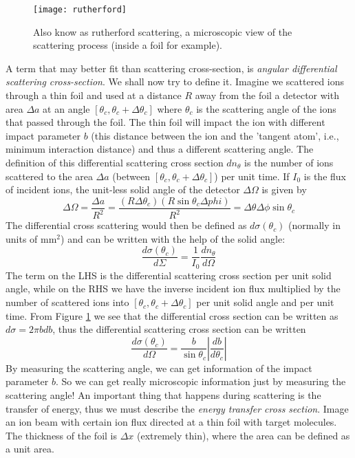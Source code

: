 \begin{figure}
	\centering
	\texttt{[image: rutherford]}
	\caption{Also know as rutherford scattering, a microscopic view of the scattering process (inside a foil for example).}
	\label{fig:rutherford}
\end{figure}
A term that may better fit than scattering cross-section, is \textit{angular differential scattering cross-section}.
We shall now try to define it.
Imagine we scattered ions through a thin foil and used at a distance $R$ away from the foil a detector with area $\Delta a$ at an angle $[\theta_c, \theta_c + \Delta \theta_c]$ where $\theta_c$ is the scattering angle of the ions that passed through the foil.
The thin foil will impact the ion with different impact parameter $b$ (this distance between the ion and the 'tangent atom', i.e., minimum interaction distance) and thus a different scattering angle.
The definition of this differential scattering cross section $dn_\theta$ is the number of ions scattered to the area $\Delta a$ (between  $[\theta_c, \theta_c + \Delta \theta_c]$) per unit time.
If $I_0$ is the flux of incident ions, the unit-less solid angle of the detector $\Delta \Omega$ is given by
$$\Delta \Omega = \frac{\Delta a}{R^2} = \frac{(R\Delta \theta_c) (R\sin\theta_c \Delta phi)}{R^2} = \Delta \theta \Delta \phi \sin\theta_c$$
The differential cross scattering would then be defined as $d\sigma (\theta_c)$ (normally in units of mm$^2$) and can be written with the help of the solid angle:
$$ \frac{d\sigma(\theta_c)}{d\Sigma} = \frac{1}{I_0} \frac{dn_\theta}{d\Omega} $$
The term on the LHS is the differential scattering cross section per unit solid angle, while on the RHS we have the inverse incident ion flux multiplied by the number of scattered ions into $[\theta_c, \theta_c + \Delta \theta_c]$ per unit solid angle and per unit time.
From Figure \ref{fig:rutherford} we see that the differential cross section can be written as $d\sigma = 2\pi b db$, thus the differential scattering cross section can be written
$$\frac{d\sigma (\theta_c)}{d\Omega} = \frac{b}{\sin\theta_c}\left|\frac{db}{d\theta_c}\right| $$
By measuring the scattering angle, we can get information of the impact parameter $b$.
So we can get really microscopic information just by measuring the scattering angle!
An important thing that happens during scattering is the transfer of energy, thus we must describe the \textit{energy transfer cross section}.
Image an ion beam with certain ion flux directed at a thin foil with target molecules.
The thickness of the foil is $\Delta x$ (extremely thin), where the area can be defined as a unit area.

